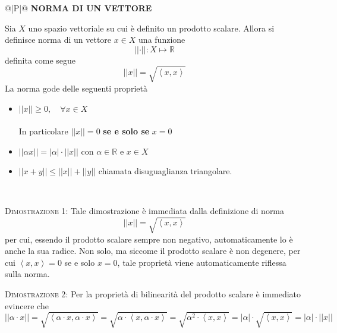 \documentclass[a4paper]{extarticle}
\renewcommand\arraystretch{}
\begin{document}
\vspace{1em}
\setlength{\tabcolsep}{14pt}
\renewcommand{\arraystretch}{2}
\noindent
\begin{tabularx}{\textwidth}{@{}|P|@{}}
    \hline
    {\textbf{NORMA DI UN VETTORE}}\\
    \parbox{\linewidth}{Sia $X$ uno spazio vettoriale su cui è definito un prodotto scalare. Allora si definisce norma di un vettore $x \in X$ una funzione
    \[\vert \vert \cdot \vert \vert : X \longmapsto \mathbb{R}\]
    definita come segue
    \[\left \vert \left \vert x \right \vert \right \vert = \sqrt{\left<x,x\right>}\]
    La norma gode delle seguenti proprietà
    \begin{itemize}
        \item $\left \vert \left \vert x \right \vert \right \vert \geq 0, \hspace{1em} \forall x \in X$\\\\
        In particolare $\left \vert \left \vert x \right \vert \right \vert = 0$ \textbf{se e solo se} $x=0$
        \item $\left \vert \left \vert \alpha x \right \vert \right \vert = \left \vert \alpha \right \vert \cdot \left \vert \left \vert x \right \vert \right \vert$ con $\alpha \in \mathbb{R}$ e $x \in X$
        \item $\left \vert \left \vert x+y \right \vert \right \vert \leq \left \vert \left \vert x \right \vert \right \vert + \left \vert \left \vert y \right \vert \right \vert$ chiamata disuguaglianza triangolare.
    \end{itemize}
    \vspace{1mm}}\\
    \hline
\end{tabularx}

\vspace{2em}
\noindent
\normalfont \normalsize
\textsc{Dimostrazione 1}: Tale dimostrazione è immediata dalla definizione di norma
\[\left \vert \left \vert x \right \vert \right \vert = \sqrt{\left<x,x\right>}\]
per cui, essendo il prodotto scalare sempre non negativo, automaticamente lo è anche la sua radice. Non solo, ma siccome il prodotto scalare è non degenere, per cui $\left<x,x\right>=0$ se e solo $x=0$, tale proprietà viene automaticamente riflessa sulla norma.

\vspace{2em}
\noindent
\normalfont \normalsize
\textsc{Dimostrazione 2}: Per la proprietà di bilinearità del prodotto scalare è immediato evincere che
\[\vert \vert \alpha \cdot x \vert \vert = \sqrt{\left< \alpha \cdot x, \alpha \cdot x\right>} = \sqrt{ \alpha \cdot \left<x, \alpha \cdot x\right>} = \sqrt{\alpha^2 \cdot \left<x,x\right>} = \left \vert \alpha \right \vert \cdot \sqrt{\left<x,x\right>} = \left \vert \alpha \right \vert \cdot \left \vert \left \vert x \right \vert \right \vert\]
\end{document}
